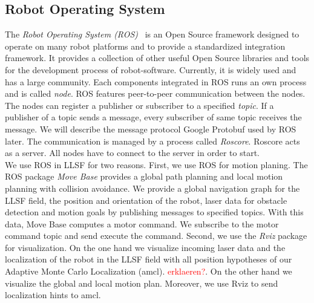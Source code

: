 \subsection{Robot Operating System}
The \textit{Robot Operating System (ROS)}~\cite{Ros} is an Open Source framework designed to operate on many robot platforms and to provide a standardized integration framework. It provides a collection of other useful Open Source libraries and tools for the development process of robot-software. Currently, it is widely used and has a large community. Each components integrated in ROS runs an own process and is called \textit{node}. ROS features peer-to-peer communication between the nodes. The nodes can register a publisher or subscriber to a specified \textit{topic}. If a publisher of a topic sends a message, every subscriber of same topic receives the message. We will describe the message protocol Google Protobuf used by ROS later. The communication is managed by a process called \textit{Roscore}. Roscore acts as a server. All nodes have to connect to the server in order to start.\\
We use ROS in LLSF for two reasons. First, we use ROS for motion planing. The ROS package \textit{Move Base} provides a global path planning and local motion planning with collision avoidance. We provide a global navigation graph for the LLSF field, the position and orientation of the robot, laser data for obstacle detection and motion goals by publishing messages to specified topics. With this data, Move Base computes a motor command. We subscribe to the motor command topic and send execute the command. Second, we use the \textit{Rviz} package for visualization. On the one hand we visualize incoming laser data and the localization of the robot in the LLSF field with all position hypotheses of our Adaptive Monte Carlo Localization (amcl). \textcolor{red}{erklaeren?}. On the other hand we visualize the global and local motion plan. Moreover, we use Rviz to send localization hints to amcl.

